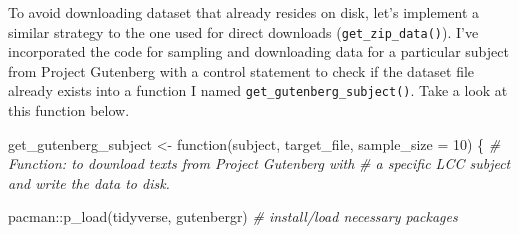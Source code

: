 \documentclass[
  letterpaper,
]{latex/krantz}
\newenvironment{Shaded}{\begin{snugshade}}{\end{snugshade}}
\newcommand{\AttributeTok}[1]{\textcolor[rgb]{0.00,0.00,0.00}{#1}}
\newcommand{\CommentTok}[1]{\textcolor[rgb]{0.00,0.00,0.00}{\textit{#1}}}
\newcommand{\ControlFlowTok}[1]{\textcolor[rgb]{0.00,0.00,0.00}{#1}}
\newcommand{\DecValTok}[1]{\textcolor[rgb]{0.00,0.00,0.00}{#1}}
\newcommand{\FunctionTok}[1]{\textcolor[rgb]{0.00,0.00,0.00}{#1}}
\newcommand{\NormalTok}[1]{\textcolor[rgb]{0.00,0.00,0.00}{#1}}
\newcommand{\OtherTok}[1]{\textcolor[rgb]{0.00,0.00,0.00}{#1}}
\newcommand{\SpecialCharTok}[1]{\textcolor[rgb]{0.00,0.00,0.00}{#1}}
\begin{document}
To avoid downloading dataset that already resides on disk, let's
implement a similar strategy to the one used for direct downloads
(\texttt{get\_zip\_data()}). I've incorporated the code for sampling and
downloading data for a particular subject from Project Gutenberg with a
control statement to check if the dataset file already exists into a
function I named \texttt{get\_gutenberg\_subject()}. Take a look at this
function below.

\begin{Shaded}
\begin{Highlighting}[]
\NormalTok{get\_gutenberg\_subject }\OtherTok{\textless{}{-}} \ControlFlowTok{function}\NormalTok{(subject, target\_file, }\AttributeTok{sample\_size =} \DecValTok{10}\NormalTok{) \{}
  \CommentTok{\# Function: to download texts from Project Gutenberg with }
  \CommentTok{\# a specific LCC subject and write the data to disk.}
  
\NormalTok{  pacman}\SpecialCharTok{::}\FunctionTok{p\_load}\NormalTok{(tidyverse, gutenbergr) }\CommentTok{\# install/load necessary packages}
  

\end{Highlighting}
\end{Shaded}
\end{document}
